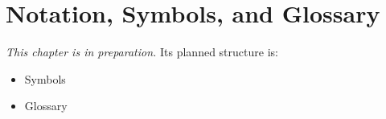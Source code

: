 
\chapter{Notation, Symbols, and Glossary}
\label{ch:appC}

\noindent\textit{This chapter is in preparation.} Its planned structure is:

\begin{itemize}
  \item Symbols
  \item Glossary
\end{itemize}

